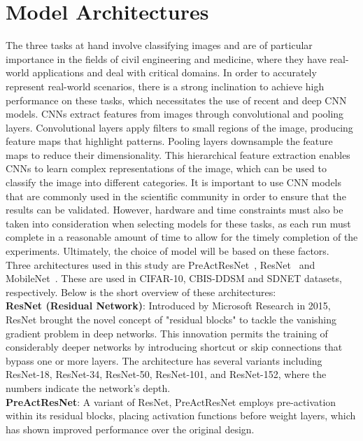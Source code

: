 \section{Model Architectures}

The three tasks at hand involve classifying images and are of particular importance in the fields of civil engineering and medicine,
where they have real-world applications and deal with critical domains. In order to accurately represent real-world scenarios,
there is a strong inclination to achieve high performance on these tasks, which necessitates the use of recent and deep CNN~\cite{lecun1995convolutional} models. 
CNNs extract features from images through convolutional and pooling layers.
Convolutional layers apply filters to small regions of the image, producing feature maps that highlight patterns.
Pooling layers downsample the feature maps to reduce their dimensionality.
This hierarchical feature extraction enables CNNs to learn complex representations of the image, which can be used to classify the image into different categories.
It is important to use CNN models that are commonly used in the scientific community in order to ensure that the results can be validated.
However, hardware and time constraints must also be taken into consideration when selecting models for these tasks, as each run must complete 
in a reasonable amount of time to allow for the timely completion of the experiments. Ultimately, the choice of model will be based on these factors.\\

Three architectures used in this study are PreActResNet~\cite{DBLP:journals/corr/HeZR016}, ResNet~\cite{he2015deep} and MobileNet~\cite{DBLP:journals/corr/HowardZCKWWAA17}. These are used in CIFAR-10, CBIS-DDSM and SDNET datasets, respectively. Below is the short overview of these architectures:\\

\textbf{ResNet (Residual Network)}:
Introduced by Microsoft Research in 2015, ResNet brought the novel concept of "residual blocks" to tackle the vanishing gradient problem in deep networks. This innovation permits the training of considerably deeper networks by introducing shortcut or skip connections that bypass one or more layers. The architecture has several variants including ResNet-18, ResNet-34, ResNet-50, ResNet-101, and ResNet-152, where the numbers indicate the network's depth.\\

\textbf{PreActResNet}:
A variant of ResNet, PreActResNet employs pre-activation within its residual blocks, placing activation functions before weight layers, which has shown improved performance over the original design.\\

